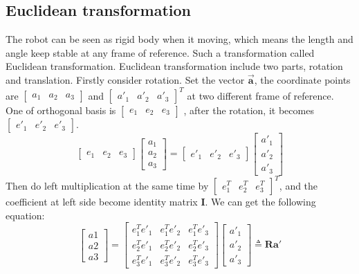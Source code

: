 \subsection{Euclidean transformation}
The robot can be seen as rigid body when it moving, which means the length and angle keep stable at any frame of reference. Such a transformation called Euclidean transformation. Euclidean transformation include two parts, rotation and translation. Firstly consider rotation. Set the vector $\pmb{\vec{a}}$, the coordinate points are 
$
    \begin{bmatrix} 
        a_1 & a_2 & a_3
    \end{bmatrix} 
$
and 
$
\left[
\begin{matrix} 
    a'_1 & a'_2 & a'_3
\end{matrix} 
\right]^T
$ at two different frame of reference. One of orthogonal basis is 
$
\begin{bmatrix} 
    e_1 & e_2 & e_3
\end{bmatrix} 
$
, after the rotation, it becomes 
$
    \begin{bmatrix} 
        e'_1 & e'_2 & e'_3
    \end{bmatrix} 
$.
$$
   \begin{bmatrix}
        e_1 & e_2 & e_3
   \end{bmatrix} 
   \begin{bmatrix}
    a_1\\
    a_2\\
    a_3
    \end{bmatrix}
    =
    \begin{bmatrix}
    e'_1 & e'_2 & e'_3
    \end{bmatrix}
    \begin{bmatrix}
    a'_1\\
    a'_2\\
    a'_3
    \end{bmatrix}
$$
Then do left multiplication at the same time by 
$
    \left[
    \begin{matrix}
    e_1^T & e_2^T & e_3^T
    \end{matrix}
    \right]^T
$, and the coefficient at left side become identity matrix $\pmb{I}$. We can get the following equation:
$$
    \begin{bmatrix}
        a1\\
        a2\\
        a3
    \end{bmatrix}=
    \begin{bmatrix}
        e^T_1e'_1 & e^T_1e'_2 & e^T_1e'_3\\
        e^T_2e'_1 & e^T_2e'_2 & e^T_2e'_3\\
        e^T_3e'_1 & e^T_3e'_2 & e^T_3e'_3
    \end{bmatrix}
    \begin{bmatrix}
    a'_1\\
    a'_2\\
    a'_3
    \end{bmatrix}
    \triangleq \pmb{Ra}'
$$
